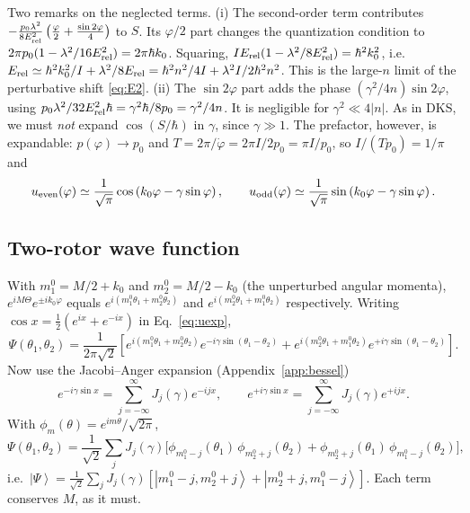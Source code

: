 \documentclass[aps,pra,onecolumn,notitlepage,nofootinbib,11pt]{revtex4-2}
\newcommand{\ket}[1]{\left|#1\right\rangle}
\newcommand{\Erel}{E_{\rm rel}}
\begin{document}
Two remarks on the neglected terms.
(i) The second-order term contributes
$-\frac{p_{0}\lambda^{2}}{8\Erel^{2}}\left(\frac{\varphi}{2}+\frac{\sin2\varphi}{4}\right)$ to $S$.
Its $\varphi/2$ part changes the quantization condition to
$2\pi p_{0}(1-\lambda^{2}/16\Erel^{2})=2\pi\hbar k_{0}$. Squaring,
$I\Erel(1-\lambda^{2}/8\Erel^{2})=\hbar^{2}k_{0}^{2}$, i.e.\
$\Erel\simeq\hbar^{2}k_{0}^{2}/I+\lambda^{2}/8\Erel=\hbar^{2}n^{2}/4I+\lambda^{2}I/2\hbar^{2}n^{2}$.
This is the large-$n$ limit of the perturbative shift \eqref{eq:E2}.
(ii) The $\sin2\varphi$ part adds the phase $(\gamma^{2}/4n)\sin2\varphi$, using
$p_{0}\lambda^{2}/32\Erel^{2}\hbar=\gamma^{2}\hbar/8p_{0}=\gamma^{2}/4n$. It is negligible
for $\gamma^{2}\ll4|n|$.
As in DKS, we must \emph{not} expand $\cos(S/\hbar)$ in $\gamma$, since $\gamma\gg1$. The
prefactor, however, is expandable: $p(\varphi)\to p_{0}$ and
$T=2\pi/\dot\varphi=2\pi I/2p_{0}=\pi I/p_{0}$, so $I/(Tp_{0})=1/\pi$ and
\begin{equation}
u_{\rm even}(\varphi)\simeq\frac{1}{\sqrt\pi}\cos\left(k_{0}\varphi-\gamma\sin\varphi\right),\qquad
u_{\rm odd}(\varphi)\simeq\frac{1}{\sqrt\pi}\sin\left(k_{0}\varphi-\gamma\sin\varphi\right).
\label{eq:uexp}
\end{equation}

\subsection{Two-rotor wave function}

With $m_{1}^{0}=M/2+k_{0}$ and $m_{2}^{0}=M/2-k_{0}$ (the unperturbed angular momenta),
$e^{iM\Theta}e^{\pm ik_{0}\varphi}$ equals $e^{i(m_{1}^{0}\theta_{1}+m_{2}^{0}\theta_{2})}$ and
$e^{i(m_{2}^{0}\theta_{1}+m_{1}^{0}\theta_{2})}$ respectively. Writing
$\cos x=\frac12(e^{ix}+e^{-ix})$ in Eq.~\eqref{eq:uexp},
\begin{equation}
\Psi(\theta_{1},\theta_{2})=\frac{1}{2\pi\sqrt2}\left[
e^{i(m_{1}^{0}\theta_{1}+m_{2}^{0}\theta_{2})}e^{-i\gamma\sin(\theta_{1}-\theta_{2})}
+e^{i(m_{2}^{0}\theta_{1}+m_{1}^{0}\theta_{2})}e^{+i\gamma\sin(\theta_{1}-\theta_{2})}\right].
\label{eq:Psi2}
\end{equation}
Now use the Jacobi--Anger expansion (Appendix~\ref{app:bessel})
\begin{equation}
e^{-i\gamma\sin x}=\sum_{j=-\infty}^{\infty}J_{j}(\gamma)e^{-ijx},\qquad
e^{+i\gamma\sin x}=\sum_{j=-\infty}^{\infty}J_{j}(\gamma)e^{+ijx}.
\label{eq:JA}
\end{equation}
With $\phi_{m}(\theta)=e^{im\theta}/\sqrt{2\pi}$,
\begin{equation}
\Psi(\theta_{1},\theta_{2})=\frac{1}{\sqrt2}\sum_{j}J_{j}(\gamma)\Big[
\phi_{m_{1}^{0}-j}(\theta_{1})\,\phi_{m_{2}^{0}+j}(\theta_{2})
+\phi_{m_{2}^{0}+j}(\theta_{1})\,\phi_{m_{1}^{0}-j}(\theta_{2})\Big],
\label{eq:Psischmidt}
\end{equation}
i.e.\ $\ket\Psi=\frac{1}{\sqrt2}\sum_{j}J_{j}(\gamma)\left[\ket{m_{1}^{0}-j,m_{2}^{0}+j}
+\ket{m_{2}^{0}+j,m_{1}^{0}-j}\right]$. Each term conserves $M$, as it must.
\end{document}
